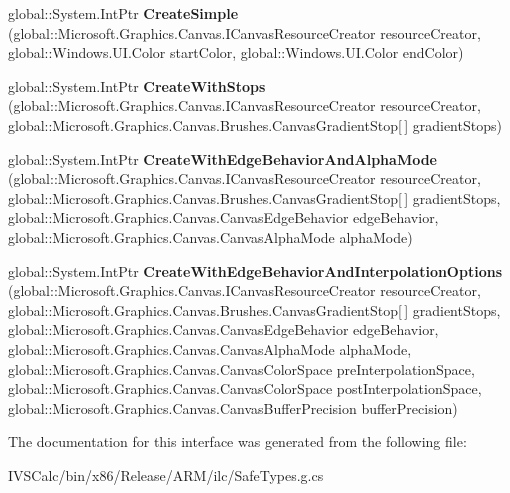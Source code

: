\begin{DoxyCompactItemize}
\item 
\mbox{\label{interface_microsoft_1_1_graphics_1_1_canvas_1_1_brushes_1_1_i_canvas_linear_gradient_brush_factory_a78c231bcdcbc03cdff5653d4a83c5a0c}} 
global\+::\+System.\+Int\+Ptr {\bfseries Create\+Simple} (global\+::\+Microsoft.\+Graphics.\+Canvas.\+I\+Canvas\+Resource\+Creator resource\+Creator, global\+::\+Windows.\+U\+I.\+Color start\+Color, global\+::\+Windows.\+U\+I.\+Color end\+Color)
\item 
\mbox{\label{interface_microsoft_1_1_graphics_1_1_canvas_1_1_brushes_1_1_i_canvas_linear_gradient_brush_factory_a15abf4d37603e12682acbddc2f22388f}} 
global\+::\+System.\+Int\+Ptr {\bfseries Create\+With\+Stops} (global\+::\+Microsoft.\+Graphics.\+Canvas.\+I\+Canvas\+Resource\+Creator resource\+Creator, global\+::\+Microsoft.\+Graphics.\+Canvas.\+Brushes.\+Canvas\+Gradient\+Stop\mbox{[}$\,$\mbox{]} gradient\+Stops)
\item 
\mbox{\label{interface_microsoft_1_1_graphics_1_1_canvas_1_1_brushes_1_1_i_canvas_linear_gradient_brush_factory_ac50e085f44297985d380ec66a1b03c11}} 
global\+::\+System.\+Int\+Ptr {\bfseries Create\+With\+Edge\+Behavior\+And\+Alpha\+Mode} (global\+::\+Microsoft.\+Graphics.\+Canvas.\+I\+Canvas\+Resource\+Creator resource\+Creator, global\+::\+Microsoft.\+Graphics.\+Canvas.\+Brushes.\+Canvas\+Gradient\+Stop\mbox{[}$\,$\mbox{]} gradient\+Stops, global\+::\+Microsoft.\+Graphics.\+Canvas.\+Canvas\+Edge\+Behavior edge\+Behavior, global\+::\+Microsoft.\+Graphics.\+Canvas.\+Canvas\+Alpha\+Mode alpha\+Mode)
\item 
\mbox{\label{interface_microsoft_1_1_graphics_1_1_canvas_1_1_brushes_1_1_i_canvas_linear_gradient_brush_factory_a9ce58dca444a71a516ca277d025d8693}} 
global\+::\+System.\+Int\+Ptr {\bfseries Create\+With\+Edge\+Behavior\+And\+Interpolation\+Options} (global\+::\+Microsoft.\+Graphics.\+Canvas.\+I\+Canvas\+Resource\+Creator resource\+Creator, global\+::\+Microsoft.\+Graphics.\+Canvas.\+Brushes.\+Canvas\+Gradient\+Stop\mbox{[}$\,$\mbox{]} gradient\+Stops, global\+::\+Microsoft.\+Graphics.\+Canvas.\+Canvas\+Edge\+Behavior edge\+Behavior, global\+::\+Microsoft.\+Graphics.\+Canvas.\+Canvas\+Alpha\+Mode alpha\+Mode, global\+::\+Microsoft.\+Graphics.\+Canvas.\+Canvas\+Color\+Space pre\+Interpolation\+Space, global\+::\+Microsoft.\+Graphics.\+Canvas.\+Canvas\+Color\+Space post\+Interpolation\+Space, global\+::\+Microsoft.\+Graphics.\+Canvas.\+Canvas\+Buffer\+Precision buffer\+Precision)
\end{DoxyCompactItemize}


The documentation for this interface was generated from the following file\+:\begin{DoxyCompactItemize}
\item 
I\+V\+S\+Calc/bin/x86/\+Release/\+A\+R\+M/ilc/Safe\+Types.\+g.\+cs\end{DoxyCompactItemize}
